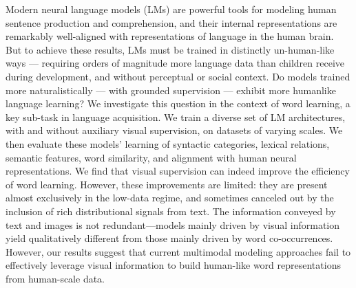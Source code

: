 Modern neural language models (LMs) are powerful tools for modeling human sentence production and comprehension, and their internal representations are remarkably well-aligned with representations of language in the human brain. But to achieve these results, LMs must be trained in distinctly un-human-like ways — requiring orders of magnitude more language data than children receive during development, and without perceptual or social context. Do models trained more naturalistically — with grounded supervision — exhibit more humanlike language learning? We investigate this question in the context of word learning, a key sub-task in language acquisition. We train a diverse set of LM architectures, with and without auxiliary visual supervision, on datasets of varying scales. We then evaluate these models’ learning of syntactic categories, lexical relations, semantic features, word similarity, and alignment with human neural representations. We find that visual supervision can indeed improve the efficiency of word learning. However, these improvements are limited: they are present almost exclusively in the low-data regime, and sometimes canceled out by the inclusion of rich distributional signals from text. The information conveyed by text and images is not redundant—models mainly driven by visual information yield qualitatively different from those mainly driven by word co-occurrences. However, our results suggest that current multimodal modeling approaches fail to effectively leverage visual information to build human-like word representations from human-scale data.